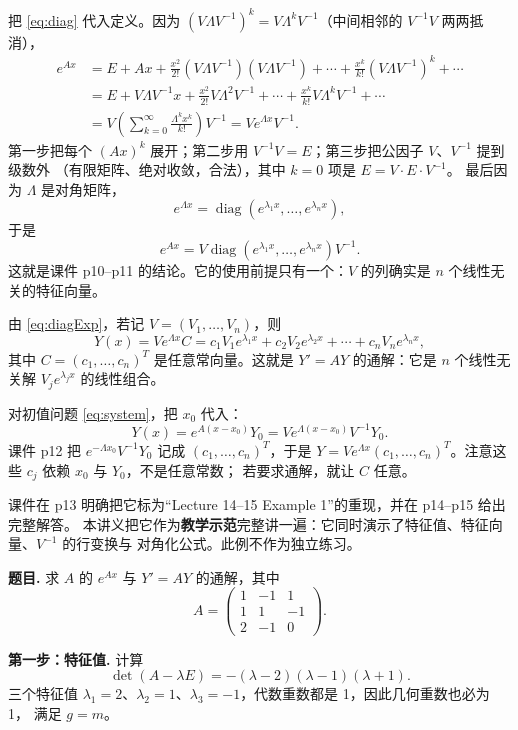 \documentclass[11pt]{ctexart}
\newcommand{\pmat}[1]{\begin{pmatrix}#1\end{pmatrix}}
\newcommand{\Ax}{Ax}
\begin{document}
把 \eqref{eq:diag} 代入定义。因为 $(V\Lambda V^{-1})^k=V\Lambda^kV^{-1}$（中间相邻的
$V^{-1}V$ 两两抵消），
\[
\begin{aligned}
e^{Ax}
&=E+Ax+\frac{x^2}{2!}(V\Lambda V^{-1})(V\Lambda V^{-1})+\cdots
+\frac{x^k}{k!}(V\Lambda V^{-1})^k+\cdots\\
&=E+V\Lambda V^{-1}x+\frac{x^2}{2!}V\Lambda^2V^{-1}+\cdots
+\frac{x^k}{k!}V\Lambda^kV^{-1}+\cdots\\
&=V\left(\sum_{k=0}^{\infty}\frac{\Lambda^kx^k}{k!}\right)V^{-1}
=Ve^{\Lambda x}V^{-1}.
\end{aligned}
\]
第一步把每个 $(\Ax)^k$ 展开；第二步用 $V^{-1}V=E$；第三步把公因子 $V$、$V^{-1}$ 提到级数外
（有限矩阵、绝对收敛，合法），其中 $k=0$ 项是 $E=V\cdot E\cdot V^{-1}$。
最后因为 $\Lambda$ 是对角矩阵，
\[
e^{\Lambda x}=\operatorname{diag}\left(e^{\lambda_1x},\dots,e^{\lambda_nx}\right),
\]
于是
\begin{equation}\label{eq:diagExp}
e^{Ax}=V\operatorname{diag}\left(e^{\lambda_1x},\dots,e^{\lambda_nx}\right)V^{-1}.
\end{equation}
这就是课件 p10--p11 的结论。它的使用前提只有一个：$V$ 的列确实是 $n$ 个线性无关的特征向量。


由 \eqref{eq:diagExp}，若记 $V=(V_1,\dots,V_n)$，则
\[
Y(x)=Ve^{\Lambda x}C
=c_1V_1e^{\lambda_1x}+c_2V_2e^{\lambda_2x}+\cdots+c_nV_ne^{\lambda_nx},
\]
其中 $C=(c_1,\dots,c_n)^T$ 是任意常向量。这就是 $Y'=AY$ 的通解：它是 $n$ 个线性无关解
$V_je^{\lambda_jx}$ 的线性组合。

对初值问题 \eqref{eq:system}，把 $x_0$ 代入：
\[
Y(x)=e^{A(x-x_0)}Y_0=Ve^{\Lambda(x-x_0)}V^{-1}Y_0 .
\]
课件 p12 把 $e^{-\Lambda x_0}V^{-1}Y_0$ 记成 $(c_1,\dots,c_n)^T$，于是
$Y=Ve^{\Lambda x}(c_1,\dots,c_n)^T$。注意这些 $c_j$ 依赖 $x_0$ 与 $Y_0$，不是任意常数；
若要求通解，就让 $C$ 任意。


课件在 p13 明确把它标为“Lecture 14--15 Example 1”的重现，并在 p14--p15 给出完整解答。
本讲义把它作为\textbf{教学示范}完整讲一遍：它同时演示了特征值、特征向量、$V^{-1}$ 的行变换与
对角化公式。此例不作为独立练习。

\textbf{题目.} 求 $A$ 的 $e^{Ax}$ 与 $Y'=AY$ 的通解，其中
\[
A=\pmat{1&-1&1\\1&1&-1\\2&-1&0}.
\]

\textbf{第一步：特征值.} 计算
\[
\det(A-\lambda E)=-(\lambda-2)(\lambda-1)(\lambda+1).
\]
三个特征值 $\lambda_1=2$、$\lambda_2=1$、$\lambda_3=-1$，代数重数都是 1，因此几何重数也必为 1，
满足 $g=m$。
\end{document}

